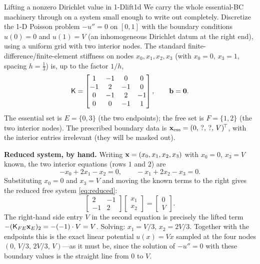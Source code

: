 \begin{workedexample}{Lifting a nonzero Dirichlet value in 1-D}{lift1d}
We carry the whole essential-BC machinery through on a system small enough to
write out completely. Discretize the 1-D Poisson problem $-u''=0$ on $[0,1]$ with
the boundary conditions $u(0)=0$ and $u(1)=V$ (an inhomogeneous Dirichlet datum
at the right end), using a uniform grid with two interior nodes. The standard
finite-difference/finite-element stiffness on nodes $x_0,x_1,x_2,x_3$ (with
$x_0=0$, $x_3=1$, spacing $h=\tfrac13$) is, up to the factor $1/h$,
\[
  \mathsf{K} =
  \begin{bmatrix}
     1 & -1 &  0 &  0\\
    -1 &  2 & -1 &  0\\
     0 & -1 &  2 & -1\\
     0 &  0 & -1 &  1
  \end{bmatrix},
  \qquad \mathbf{b} = \mathbf{0}.
\]
The essential set is $E=\{0,3\}$ (the two endpoints); the free set is $F=\{1,2\}$
(the two interior nodes). The prescribed boundary data is
$\mathbf{x}_{\mathrm{ess}}=(0,\,?,\,?,\,V)^{\!\top}$, with the interior entries
irrelevant (they will be masked out).

\medskip\noindent\textbf{Reduced system, by hand.}
Writing $\mathbf{x}=(x_0,x_1,x_2,x_3)$ with $x_0=0$, $x_3=V$ known, the two interior
equations (rows $1$ and $2$) are
\[
  -x_0 + 2x_1 - x_2 = 0, \qquad -x_1 + 2x_2 - x_3 = 0.
\]
Substituting $x_0=0$ and $x_3=V$ and moving the known terms to the right gives the
reduced free system \cref{eq:reduced}:
\[
  \begin{bmatrix} 2 & -1\\ -1 & 2\end{bmatrix}
  \begin{bmatrix} x_1\\ x_2\end{bmatrix}
  =
  \begin{bmatrix} 0\\ V\end{bmatrix}.
\]
The right-hand side entry $V$ in the second equation is precisely the lifted term
$-(\mathsf{K}_{FE}\mathbf{x}_E)_2 = -(-1)\cdot V = V$. Solving:
$x_1 = V/3$, $x_2 = 2V/3$. Together with the endpoints this is the exact
linear potential $u(x)=Vx$ sampled at the four nodes
$(0,\,V/3,\,2V/3,\,V)$---as it must be, since the solution of $-u''=0$ with these
boundary values is the straight line from $0$ to $V$.


\end{workedexample}
